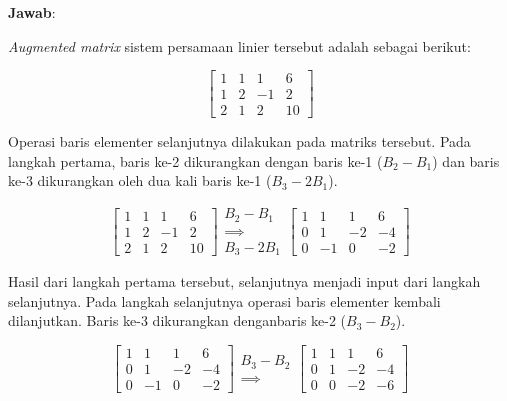 \documentclass[
]{book}
\theoremstyle{definition}
\theoremstyle{definition}
\theoremstyle{definition}
\theoremstyle{definition}
\theoremstyle{remark}
\begin{document}
\textbf{Jawab}:

\emph{Augmented matrix} sistem persamaan linier tersebut adalah sebagai berikut:

\[
\begin{bmatrix}
     1 & 1 & 1 & 6     \\[0.3em]
     1 & 2 & -1 & 2     \\[0.3em]
     2 & 1 & 2 & 10
\end{bmatrix}
\]

Operasi baris elementer selanjutnya dilakukan pada matriks tersebut. Pada langkah pertama, baris ke-2 dikurangkan dengan baris ke-1 (\(B_2-B_1\)) dan baris ke-3 dikurangkan oleh dua kali baris ke-1 (\(B_3-2B_1\)).

\begin{equation*}
\begin{bmatrix}
     1 & 1 & 1 & 6     \\[0.3em]
     1 & 2 & -1 & 2     \\[0.3em]
     2 & 1 & 2 & 10
\end{bmatrix}
\begin{matrix}
  B_2-B_1 \\
  \implies \\
  B_3-2B_1
\end{matrix}
\begin{bmatrix}
     1 & 1 & 1 & 6     \\[0.3em]
     0 & 1 & -2 & -4     \\[0.3em]
     0 & -1 & 0 & -2
\end{bmatrix}
\end{equation*}

Hasil dari langkah pertama tersebut, selanjutnya menjadi input dari langkah selanjutnya. Pada langkah selanjutnya operasi baris elementer kembali dilanjutkan. Baris ke-3 dikurangkan denganbaris ke-2 (\(B_3-B_2\)).

\begin{equation*}
\begin{bmatrix}
     1 & 1 & 1 & 6     \\[0.3em]
     0 & 1 & -2 & -4     \\[0.3em]
     0 & -1 & 0 & -2
\end{bmatrix}
\begin{matrix}
  B_3-B_2 \\
  \implies
\end{matrix}
\begin{bmatrix}
     1 & 1 & 1 & 6     \\[0.3em]
     0 & 1 & -2 & -4     \\[0.3em]
     0 & 0 & -2 & -6
\end{bmatrix}
\end{equation*}
\end{document}
